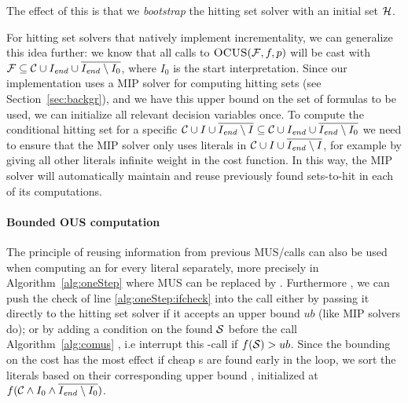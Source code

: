 The effect of this is that we \textit{bootstrap} the hitting set solver with an initial set $\mathcal{H}$.

For hitting set solvers that natively implement incrementality, we can generalize this idea further: we know that all calls to $\textsc{OCUS}(\mathcal{F} ,f,p)$ will be cast with $\mathcal{F}  \subseteq \mathcal{C}\cup I_\mathit{end}  \cup \overline{I_\mathit{end}  \setminus I_0}$, where $I_0$ is the start interpretation. Since our implementation uses a MIP solver for computing hitting sets (see Section~\ref{sec:backgr}), and we have this upper bound on the set of formulas to be used, we can initialize all relevant decision variables once. To compute the conditional hitting set for a specific $\mathcal{C} \cup I\cup \overline{I_\mathit{end} \setminus I} \subseteq \mathcal{C}\cup I_\mathit{end}  \cup \overline{I_\mathit{end}  \setminus I_0}$ we need to ensure that the MIP solver only uses literals in $\mathcal{C} \cup I\cup \overline{I_\mathit{end} \setminus I}$, for example by giving all other literals infinite weight in the cost function. In this way, the MIP solver will automatically maintain and reuse previously found sets-to-hit in each of its computations. 
\paragraph{Bounded OUS computation} The principle of reusing information from previous MUS/\omus calls can also be used when computing an \omus{} for every literal separately, more precisely in Algorithm~\ref{alg:oneStep} where MUS can be replaced by \omus. 
Furthermore , we can push the check of line \ref{alg:oneStep:ifcheck} into the \omus call either by passing it directly to the hitting set solver if it accepts an upper bound $ub$ (like MIP solvers do); or by adding a condition on the found $\mathcal{S}$ before the \sat call %
Algorithm~\ref{alg:comus} , i.e interrupt this \omus-call if $f(\mathcal{S}) > ub$.  
Since the bounding on the \omus cost has the most effect if cheap \omus{}s are found early in the loop, we sort the literals based on their corresponding upper bound  , initialized at $f(\mathcal{C}  \land I_0 \land \overline{I_\mathit{end}  \setminus I_0})$.

